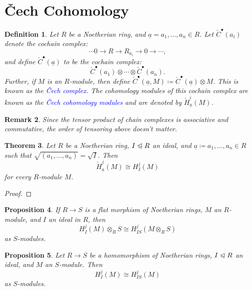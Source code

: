 \documentclass[10pt]{article}
\theoremstyle{thmstyle}
\newtheorem{theorem}{Theorem}[section]
\newtheorem{proposition}[theorem]{Proposition}
\theoremstyle{defstyle}
\newtheorem{definition}[theorem]{Definition}
\newtheorem{remark}[theorem]{Remark}
\newcommand{\define}[1]{\textcolor{blue}{\textit{#1}}}
\newcommand{\noreq}{\trianglelefteqslant}
\newcommand{\ul}[1]{\underline{#1}}
\newcommand{\cech}[1]{\mathbin{\check{#1}}}
\begin{document}
\section{\v Cech Cohomology}

\begin{definition}
	Let $R$ be a Noetherian ring, and $\ul a = a_1,\dots,a_n\in R$. Let $\cech{C}^\bullet(a_i)$ denote the cochain complex:
	\begin{equation*}
		\cdots 0\to R\to R_{a_i}\to 0\to\cdots,
	\end{equation*}
	and define $\cech{C}^\bullet(\ul a)$ to be the cochain complex:
	\begin{equation*}
		\cech{C}^\bullet(a_1)\otimes\cdots\otimes \cech{C}^\bullet(a_n).
	\end{equation*}
	Further, if $M$ is an $R$-module, then define $\cech{C}^\bullet(\ul a, M)\coloneq \cech{C}^\bullet(\ul a)\otimes M$. This is known as the \define{\v{C}ech complex}. The cohomology modules of this cochain complex are known as the \define{\v{C}ech cohomology modules} and are denoted by $\cech{H}^i_{\ul a}(M)$.
\end{definition}

\begin{remark}
	Since the tensor product of chain complexes is associative and commutative, the order of tensoring above doesn't matter. 
\end{remark}

\begin{theorem}
	Let $R$ be a Noetherian ring, $I\noreq R$ an ideal, and $\ul a\coloneq a_1,\dots, a_n\in R$ such that $\sqrt{(a_1,\dots ,a_n)} = \sqrt I$. Then 
	\begin{equation*}
		\cech{H}^j_{\ul a}(M)\cong  H^j_I(M)
	\end{equation*}
	for every $R$-module $M$.
\end{theorem}
\begin{proof}
	
\end{proof}

\begin{proposition}
	If $R\to S$ is a flat morphism of Noetherian rings, $M$ an $R$-module, and $I$ an ideal in $R$, then 
	\begin{equation*}
		H^j_I(M)\otimes_R S\cong H^j_{IS}(M\otimes_R S)
	\end{equation*}
	as $S$-modules.
\end{proposition}

\begin{proposition}
	Let $R\to S$ be a homomorphism of Noetherian rings, $I\noreq R$ an ideal, and $M$ an $S$-module. Then 
	\begin{equation*}
		H^j_{I}(M)\cong H^j_{IS}(M)
	\end{equation*}
	as $S$-modules.
\end{proposition}
\end{document}
